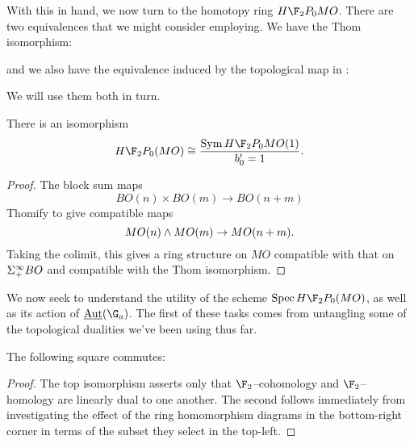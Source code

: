 With this in hand, we now turn to the homotopy ring $H\F_2P_0 MO$.  There are two equivalences that we might consider employing.  We have the Thom isomorphism:
\begin{center}
\end{center}
and we also have the equivalence induced by the topological map in :
\begin{center}
\end{center}
We will use them both in turn.

\begin{corollary}\label{HF2MOisFree}
There is an isomorphism \[H\F_2P_0(MO) \cong \frac{\Sym H\F_2P_0 MO(1)}{b'_0 = 1}.\]
\end{corollary}
\begin{proof}
The block sum maps \[BO(n) \times BO(m) \to BO(n+m)\] Thomify to give compatible maps \[MO(n) \wedge MO(m) \to MO(n+m).\]  Taking the colimit, this gives a ring structure on $MO$ compatible with that on $\Sigma^\infty_+ BO$ and compatible with the Thom isomorphism.
\end{proof}

We now seek to understand the utility of the scheme $\Spec H\F_2P_0(MO)$, as well as its action of $\InternalAut(\G_a)$.  The first of these tasks comes from untangling some of the topological dualities we've been using thus far.
\begin{lemma}\label{DetectingMORingMapsInHomotopy}
The following square commutes:
\begin{center}
\end{center}
\end{lemma}
\begin{proof}
The top isomorphism asserts only that $\F_2$--cohomology and $\F_2$--homology are linearly dual to one another.  The second follows immediately from investigating the effect of the ring homomorphism diagrams in the bottom-right corner in terms of the subset they select in the top-left.
\end{proof}

